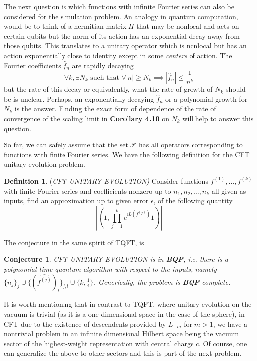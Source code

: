 \documentclass[twoside,11pt,titlepage]{amsart}
\renewcommand{\=}[1]{\stackrel{#1}{=}} %
\newtheorem{cnj}[thm]{Conjecture}
\theoremstyle{definition}
\newtheorem{dfn}{Definition}
\theoremstyle{remark}
\begin{document}
The next question is which functions with infinite Fourier series can also be considered for the simulation problem. An analogy in quantum computation, would be to think of a hermitian matrix $H$ that may be nonlocal and acts on certain qubits but the norm of its action has an exponential decay away from those qubits. This translates to a unitary operator which is nonlocal but has an action exponentially close to identity except in some \textit{centers} of action. The Fourier coefficients $\hat{f}_n$ are rapidly decaying 
$$ \forall k , \exists N_k \text{  such that   } \forall |n| \ge N_k \implies |\hat{f}_n| \le \frac{1}{n^k}$$
but the rate of this decay or equivalently, what the rate of growth of $N_k$ should be is unclear. Perhaps, an exponentially decaying $\hat{f}_n$ or a polynomial growth for $N_k$ is the answer. Finding the exact form of dependence of the rate of convergence of the scaling limit in \hyperref[cor4.10]{\textbf{Corollary 4.10}} on $N_k$ will help to answer this question.

So far, we can safely assume that the set $\mathcal{F}$ has all operators corresponding to functions with finite Fourier series. We have the following definition for the CFT unitary evolution problem.
\begin{dfn}\label{dfn15}
(\textit{CFT UNITARY EVOLUTION)} Consider functions $f^{(1)},\ldots,f^{(k)}$ with finite Fourier series and coefficients nonzero up to $n_1,n_2,\ldots,n_k$ all given as inputs, find an approximation up to given error $\epsilon$, of the following quantity
$$|(1,\prod_{j=1}^k e^{iL(f^{(j)})}1)|$$
\end{dfn}
The conjecture in the same spirit of TQFT, is
\begin{cnj}\label{cnj5.6}
CFT UNITARY EVOLUTION is in \textbf{BQP}, i.e. there is a polynomial time quantum algorithm with respect to the inputs, namely $\{n_j\}_j \cup \{(\hat{f^{(j)}})_l\}_{j,l} \cup \{k,\frac{1}{\epsilon}\}$. Generically, the problem is \textbf{BQP}-complete.
\end{cnj}

It is worth mentioning that in contrast to TQFT, where unitary evolution on the vacuum is trivial (as it is a one dimensional space in the case of the sphere), in CFT due to the existence of descendents provided by $L_{-m}$ for $m>1$, we have a nontrivial problem in an infinite dimensional Hilbert space being the vacuum sector of the highest-weight representation with central charge $c$. Of course, one can generalize the above to other sectors and this is part of the next problem.
\end{document}
